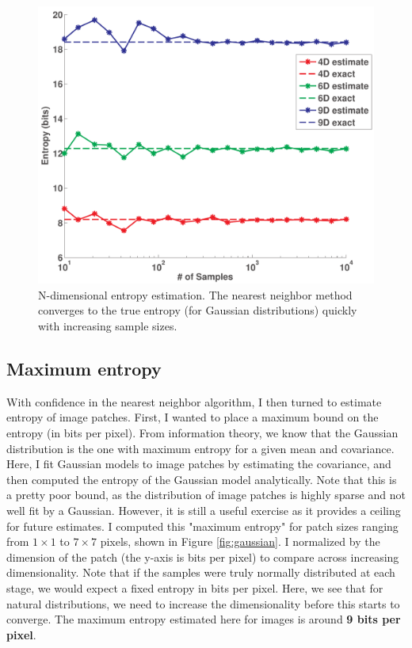 \documentclass[10pt,twocolumn,letterpaper]{article}
\begin{document}
\begin{figure}[h]
\begin{center}
   \includegraphics[width=1.0\linewidth]{ND.pdf}
   \caption{N-dimensional entropy estimation. The nearest neighbor method converges to the true entropy (for Gaussian distributions) quickly with increasing sample sizes.}
\label{fig:ND}
\end{center}
\end{figure}

\subsection{Maximum entropy}
With confidence in the nearest neighbor algorithm, I then turned to estimate entropy of image patches. First, I wanted to place a maximum bound on the entropy (in bits per pixel). From information theory, we know that the Gaussian distribution is the one with maximum entropy for a given mean and covariance. Here, I fit Gaussian models to image patches by estimating the covariance, and then computed the entropy of the Gaussian model analytically. Note that this is a pretty poor bound, as the distribution of image patches is highly sparse and not well fit by a Gaussian. However, it is still a useful exercise as it provides a ceiling for future estimates. I computed this "maximum entropy" for patch sizes ranging from $1\times 1$ to $7\times 7$ pixels, shown in Figure \ref{fig:gaussian}. I normalized by the dimension of the patch (the y-axis is bits per pixel) to compare across increasing dimensionality. Note that if the samples were truly normally distributed at each stage, we would expect a fixed entropy in bits per pixel. Here, we see that for natural distributions, we need to increase the dimensionality before this starts to converge. The maximum entropy estimated here for images is around \textbf{9 bits per pixel}.
\end{document}
